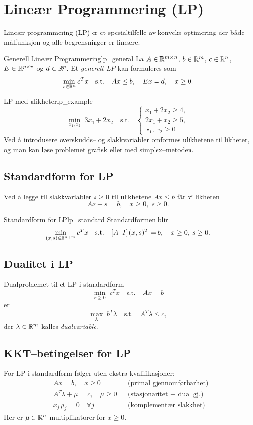 \section{Lineær Programmering (LP)}
Lineær programmering (LP) er et spesialtilfelle av konveks optimering der både målfunksjon og alle begrensninger er lineære.

\begin{definition}{Generell Lineær Programmering}{lp_general}
	La $A\in\mathbb{R}^{m\times n}$, $b\in\mathbb{R}^m$, $c\in\mathbb{R}^n$, $E\in\mathbb{R}^{p\times n}$ og $d\in\mathbb{R}^p$. Et \emph{generelt LP} kan formuleres som
	\[
		\min_{x\in\mathbb{R}^n} c^T x
		\quad\text{s.t.}\quad
		A x \le b,\quad
		E x = d,\quad
		x \ge0.
	\]
\end{definition}

\begin{example}{LP med ulikheter}{lp_example}
\[
	\min_{x_1,x_2} \; 3x_1 + 2x_2
	\quad\text{s.t.}\quad
	\begin{cases}
		x_1 + 2x_2 \ge 4,\\
		2x_1 +  x_2 \ge 5,\\
		x_1,\,x_2 \ge 0.
	\end{cases}
\]
Ved å introdusere overskudds-- og slakkvariabler omformes ulikhetene til likheter, og man kan løse problemet grafisk eller med simplex--metoden.
\end{example}
\subsection{Standardform for LP}
Ved å legge til slakkvariabler $s\ge0$ til ulikhetene $A x\le b$ får vi likheten
\[
	A x + s = b,\quad x\ge0,\;s\ge0.
\]
\begin{definition}{Standardform for LP}{lp_standard}
	Standardformen blir
	\[
		\min_{(x,s)\in\mathbb{R}^{n+m}} c^T x
		\quad\text{s.t.}\quad
		[A\;\;I]\,(x,s)^T = b,\quad
		x\ge0,\;s\ge0.
	\]
\end{definition}

\subsection{Dualitet i LP}
Dualproblemet til et LP i standardform
\[
	\min_{x\ge0}\;c^T x
	\quad\text{s.t.}\quad
	A x = b
\]
er
\[
	\max_{\lambda}\;b^T\lambda
	\quad\text{s.t.}\quad
	A^T\lambda \le c,
\]
der $\lambda\in\mathbb{R}^m$ kalles \emph{dualvariable}.

\subsection{KKT--betingelser for LP}
For LP i standardform følger uten ekstra kvalifikasjoner:
\begin{align*}
	&A x = b,\quad x\ge0 &&\text{(primal gjennomførbarhet)}\\
	&A^T\lambda + \mu = c,\quad \mu\ge0 &&\text{(stasjonaritet + dual gj.)}\\
	&x_j\,\mu_j = 0\quad\forall j &&\text{(komplementær slakkhet)}
\end{align*}
Her er $\mu\in\mathbb{R}^n$ multiplikatorer for $x\ge0$.


